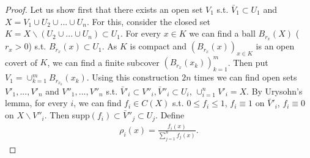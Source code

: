 \ifdetailed
\begin{proof}
    Let us show first that there exists an open set \(V_1\) s.t. \(\bar{V}_1\subset U_1\) and \(X=V_1\cup U_2\cup ... \cup U_n\). For this, consider the closed set \(K=X\backslash\left(U_2\cup ... \cup U_n\right) \subset U_1\). For every \(x\in K\) we can find a ball \(B_{r_x}(X)\) (\(r_x>0\)) s.t. \(B_{r_x}(x)\subset U_1\). As \(K\) is compact and \((B_{r_x}(x))_{x\in K} \) is an open covert of \(K\), we can find a finite subcover \((B_{r_x}(x_k))_{k=1}^{m}\). Then put \(V_1 = \cup_{k=1}^{m}B_{r_{x_k}}(x_k)\). Using this construction \(2n\) times we can find open sets \(V'_1, ..., V'_n\) and \(V''_1, ..., V''_n\) s.t. \(\bar{V}'_i\subset V''_{i}, \bar{V}''_{i}\subset U_i\), \(\cup_{i=1}^{n}V'_i = X\). By Urysohn's lemma, for every \(i\), we can find \(f_i\in C(X)\) s.t. \(0\leq f_i\leq 1\), \(f_i\equiv 1\) on \(\bar{V}'_i\), \(f_i\equiv 0\) on \(X\backslash V''_i\). Then supp\((f_i)\subset \bar{V}''_j\subset U_j\). Define
    \begin{align*}
        \rho_i(x) = \frac{f_i(x)}{\sum_{j=1}^{n}f_j(x)}.
    \end{align*}
\end{proof}
\fi
